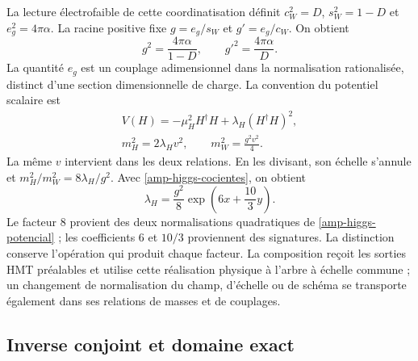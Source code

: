 La lecture électrofaible de cette coordinatisation définit
$c_W^2=D$, $s_W^2=1-D$ et $e_g^2=4\pi\alpha$. La racine positive fixe
$g=e_g/s_W$ et $g'=e_g/c_W$. On obtient
\begin{equation}
 g^2=\frac{4\pi\alpha}{1-D},\qquad
 g'^2=\frac{4\pi\alpha}{D}.
 \label{amp-higgs-calibre}
\end{equation}
La quantité $e_g$ est un couplage adimensionnel dans la normalisation
rationalisée, distinct d’une section dimensionnelle de charge.
La convention du potentiel scalaire est
\begin{equation}
 \begin{gathered}
 V(H)=-\mu_H^2H^\dagger H+\lambda_H(H^\dagger H)^2,\\
 m_H^2=2\lambda_Hv^2,\qquad m_W^2=\frac{g^2v^2}{4}.
 \end{gathered}
 \label{amp-higgs-potencial}
\end{equation}
La même $v$ intervient dans les deux relations. En les divisant, son échelle
s’annule et $m_H^2/m_W^2=8\lambda_H/g^2$. Avec
\eqref{amp-higgs-cocientes}, on obtient
\begin{equation}
 \boxed{\lambda_H=\frac{g^2}{8}\exp\!\left(6x+\frac{10}{3}y\right).}
 \label{amp-higgs-lambda}
\end{equation}
Le facteur $8$ provient des deux normalisations quadratiques de
\eqref{amp-higgs-potencial} ; les coefficients $6$ et $10/3$ proviennent des
signatures. La distinction conserve l’opération qui produit chaque facteur.
La composition reçoit les sorties HMT préalables et utilise cette réalisation physique
à l’arbre à échelle commune ; un changement de normalisation du champ, d’échelle ou
de schéma se transporte également dans ses relations de masses et de couplages.

\subsection{Inverse conjoint et domaine exact}

